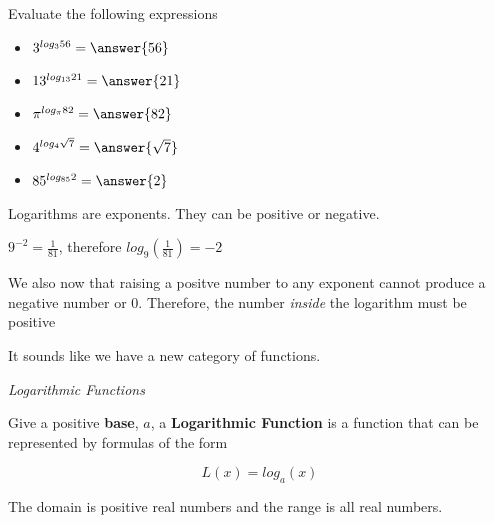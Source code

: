 \documentclass{ximera}
\begin{document}
\begin{example}
Evaluate the following expressions

\begin{itemize}
\item  $3^{log_3{56}} = \answer{56}$
\item  $13^{log_{13}{21}} = \answer{21}$
\item  $\pi^{log_{\pi}{82}} = \answer{82}$
\item  $4^{log_4{\sqrt{7}}} = \answer{\sqrt{7}}$
\item  $85^{log_{85}{2}} = \answer{2}$

\end{itemize}

\end{example}












Logarithms are exponents.  They can be positive or negative.



$9^{-2} = \frac{1}{81}$, therefore  $log_{9}\left(\frac{1}{81}\right) = -2$



We also now that raising a positve number to any exponent cannot produce a negative number or $0$.  Therefore, the number \textit{inside} the logarithm must be positive



It sounds like we have a new category of functions.




\begin{definition} \textit{Logarithmic Functions}

Give a positive \textbf{base}, $a$, a \textbf{Logarithmic Function} is a function that can be represented by formulas of the form

\[     L(x) =    log_a(x)            \]

The domain is positive real numbers and the range is all real numbers.

\end{definition}
\end{document}
